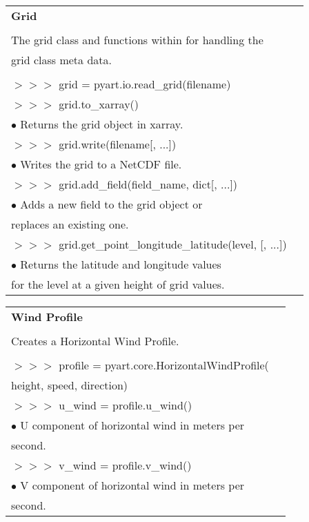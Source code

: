 \documentclass[potrait, z1paper, fontscale=0.33]{baposter} %
\begin{document}
\begin{poster}
{\begin{flushleft}
\begin{tabular}{@{}ll@{}}
\\
\multicolumn{2}{l}{\cellcolor[HTML]{DDFFFF}\bf Grid} \\
\\
The grid class and functions within for handling the\\
grid class meta data.\\
\\
$>$$>$$>$ grid = pyart.io.read\_grid(filename)\\
$>$$>$$>$ grid.to\_xarray()\\
\-\hspace{0.4cm} $\bullet$ Returns the grid object in xarray.\\
$>$$>$$>$ grid.write(filename[, ...])\\
\-\hspace{0.4cm} $\bullet$ Writes the grid to a NetCDF file.\\
$>$$>$$>$ grid.add\_field(field\_name, dict[, ...])\\
\-\hspace{0.4cm} $\bullet$ Adds a new field to the grid object or\\
\-\hspace{0.7cm} replaces an existing one.\\
$>$$>$$>$ grid.get\_point\_longitude\_latitude(level, [, ...])\\
\-\hspace{0.4cm} $\bullet$ Returns the latitude and longitude values\\
\-\hspace{0.7cm} for the level at a given height of grid values.\\
\end{tabular}

\begin{tabular}{@{}ll@{}}
\\
\multicolumn{2}{l}{\cellcolor[HTML]{DDFFFF}\bf Wind Profile} \\
\\
Creates a Horizontal Wind Profile.\\
\\
$>$$>$$>$ profile = pyart.core.HorizontalWindProfile(\\
\-\hspace{1.5cm} height, speed, direction)\\
$>$$>$$>$ u\_wind = profile.u\_wind()\\
\-\hspace{0.4cm} $\bullet$ U component of horizontal wind in meters per\\
\-\hspace{0.7cm} second.\\
$>$$>$$>$ v\_wind = profile.v\_wind()\\
\-\hspace{0.4cm} $\bullet$ V component of horizontal wind in meters per\\
\-\hspace{0.7cm} second.\\
\end{tabular}


\end{flushleft}}
\end{poster}
\end{document}
